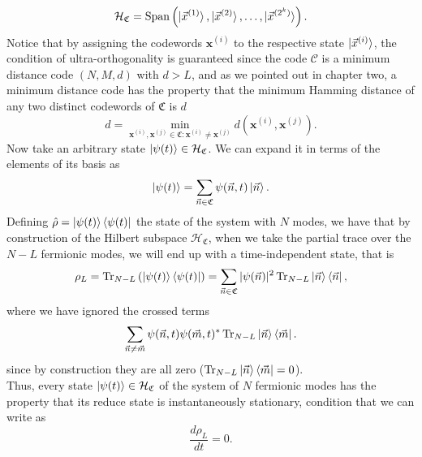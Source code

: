 \begin{equation}
\mathcal{H}_{\mathfrak{C}} = \operatorname{Span}\left( \mathinner{|{\vec{x}^{(1)}}\rangle},\mathinner{|{\vec{x}^{(2)}}\rangle},\ldots,\mathinner{|{\vec{x}^{(2^k)}}\rangle} \right).
\end{equation}
Notice that by assigning the codewords $\mathbf{x}^{(i)}$ to the respective state $\mathinner{|{\vec{x}^{(i)}}\rangle}$, the condition of ultra-orthogonality is guaranteed since the code $\mathcal{C}$ is a minimum distance code $(N,M,d)$ with $d>L$, and as we pointed out in chapter two, a minimum distance code has the property that the minimum Hamming distance of any two distinct codewords of $\mathfrak{C}$ is $d$
\begin{equation}
d=\min_{\mathbf{x}^{(i)},\mathbf{x}^{(j)}\in \mathfrak{C}: \mathbf{x}^{(i)}\neq\mathbf{x}^{(j)} } d(\mathbf{x}^{(i)},\mathbf{x}^{(j)}).
\end{equation}
Now take an arbitrary state $\mathinner{|{\psi(t)}\rangle}\in\mathcal{H}_{\mathfrak{C}}$. We can expand it in terms of the elements of its basis as
\begin{equation}
\mathinner{|{\psi(t)}\rangle} = \sum_{\vec{n}\in\mathfrak{C}}\psi(\vec{n},t)\mathinner{|{\vec{n}}\rangle}.
\end{equation}
Defining $\hat{\rho} =\mathinner{|{\psi(t)}\rangle} \mathinner{\langle{\psi(t)}|}$ the state of the system with $N$ modes, we have that by construction of the Hilbert subspace $\mathcal{H}_{\mathfrak{C}}$, when we take the partial trace over the $N-L$ fermionic modes, we will end up with a time-independent state, that is
\begin{equation}
\rho_{L} = \operatorname{Tr}_{N-L}\left(\mathinner{|{\psi(t)}\rangle}\mathinner{\langle{\psi(t)}|}\right) = \sum_{\vec{n}\in\mathfrak{C}} |\psi(\vec{n})|^2  \operatorname{Tr}_{N-L}\mathinner{|{\vec{n}}\rangle}\mathinner{\langle{\vec{n}}|},
\end{equation}
where we have ignored the crossed terms 
\begin{equation}
 \sum_{\vec{n}\neq\vec{m}}\psi(\vec{n},t)\psi(\vec{m},t)^{*} \operatorname{Tr}_{N-L} \mathinner{|{\vec{n}}\rangle}\mathinner{\langle{\vec{m}}|}.
\end{equation}
since by construction they are all zero ($\operatorname{Tr}_{N-L} \mathinner{|{\vec{n}}\rangle}\mathinner{\langle{\vec{m}}|}=0$).\\
\indent Thus, every state $\mathinner{|{\psi(t)}\rangle}\in\mathcal{H}_{\mathfrak{C}}$ of the system of $N$ fermionic modes has the property that its reduce state is instantaneously stationary, condition that we can write as
\begin{equation}
\frac{d\rho_L}{dt}=0.
\end{equation}


